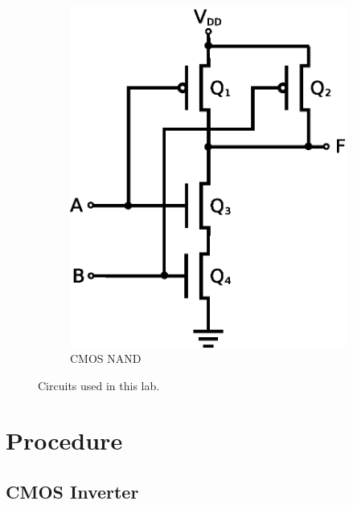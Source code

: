 \begin{figure}[hbtp]
\begin{subfigure}[b]{0.5\textwidth}
     \includegraphics[width=\textwidth]{nand}
     \caption{\label{fig:nand} CMOS NAND}
   \end{subfigure}
   \caption{\label{fig:schematics} Circuits used in this lab.}
 \end{figure}

\section{Procedure}
\label{sec:procedure}

\subsection{CMOS Inverter}
\label{sec:inverter}


